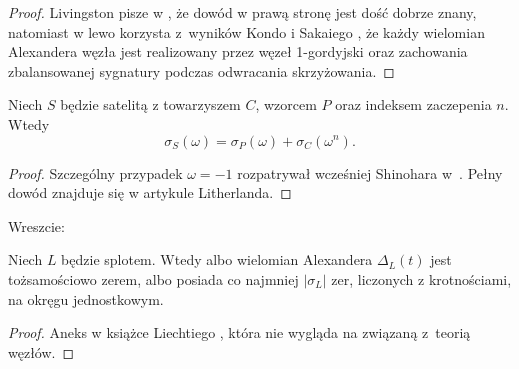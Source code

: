 \begin{proof}
    Livingston pisze w \cite{livingston18}, że dowód w prawą stronę jest dość dobrze znany, natomiast w lewo korzysta z~wyników Kondo \cite{kondo79} i Sakaiego \cite{sakai77}, że każdy wielomian Alexandera węzła jest realizowany przez węzeł 1-gordyjski oraz zachowania zbalansowanej sygnatury podczas odwracania skrzyżowania.
\end{proof}

\begin{proposition}
%
    Niech $S$ będzie satelitą z towarzyszem $C$, wzorcem $P$ oraz indeksem zaczepenia $n$.
    Wtedy
    \begin{equation}
        \sigma_S(\omega) = \sigma_P(\omega) + \sigma_C(\omega^n).
    \end{equation}
\end{proposition}

\begin{proof}
    Szczególny przypadek $\omega = -1$ rozpatrywał wcześniej Shinohara w~\cite{shinohara71}.
    Pełny dowód znajduje się w artykule \cite{litherland79} Litherlanda.
\end{proof}

Wreszcie:

\begin{proposition}
    Niech $L$ będzie splotem.
    Wtedy albo wielomian Alexandera $\Delta_L(t)$ jest tożsamościowo zerem, albo posiada co najmniej $|\sigma_L|$ zer, liczonych z krotnościami, na okręgu jednostkowym.
\end{proposition}

\begin{proof}
    Aneks w książce Liechtiego \cite{liechti16}, która nie wygląda na związaną z~teorią węzłów.
\end{proof}



